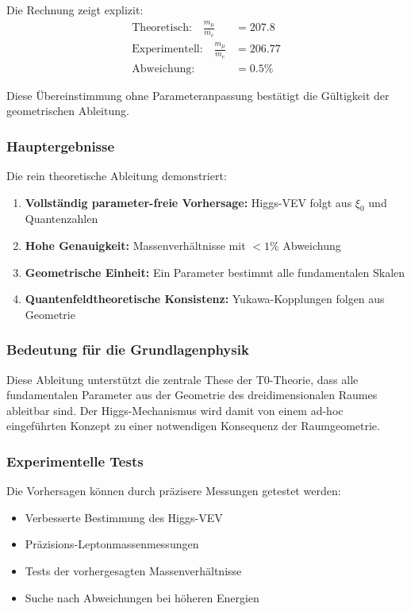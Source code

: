 Die Rechnung zeigt explizit:
\begin{align}
	\text{Theoretisch:} \quad \frac{m_\mu}{m_e} &= 207.8\\
	\text{Experimentell:} \quad \frac{m_\mu}{m_e} &= 206.77\\
	\text{Abweichung:} \quad &= 0.5\%
\end{align}

Diese Übereinstimmung ohne Parameteranpassung bestätigt die Gültigkeit der geometrischen Ableitung.

\subsubsection{Hauptergebnisse}

Die rein theoretische Ableitung demonstriert:

\begin{enumerate}
	\item \textbf{Vollständig parameter-freie Vorhersage:} Higgs-VEV folgt aus $\xi_0$ und Quantenzahlen
	\item \textbf{Hohe Genauigkeit:} Massenverhältnisse mit $< 1\%$ Abweichung
	\item \textbf{Geometrische Einheit:} Ein Parameter bestimmt alle fundamentalen Skalen
	\item \textbf{Quantenfeldtheoretische Konsistenz:} Yukawa-Kopplungen folgen aus Geometrie
\end{enumerate}

\subsubsection{Bedeutung für die Grundlagenphysik}

Diese Ableitung unterstützt die zentrale These der T0-Theorie, dass alle fundamentalen Parameter aus der Geometrie des dreidimensionalen Raumes ableitbar sind. Der Higgs-Mechanismus wird damit von einem ad-hoc eingeführten Konzept zu einer notwendigen Konsequenz der Raumgeometrie.

\subsubsection{Experimentelle Tests}

Die Vorhersagen können durch präzisere Messungen getestet werden:

\begin{itemize}
	\item Verbesserte Bestimmung des Higgs-VEV
	\item Präzisions-Leptonmassenmessungen
	\item Tests der vorhergesagten Massenverhältnisse
	\item Suche nach Abweichungen bei höheren Energien
\end{itemize}

